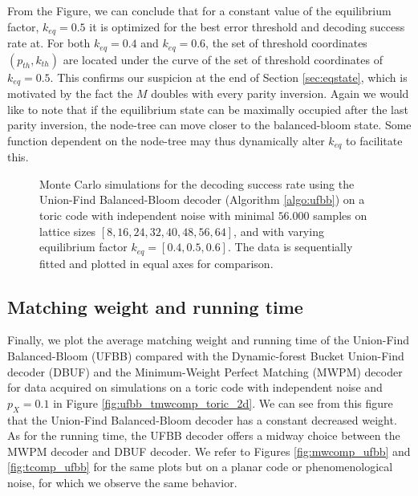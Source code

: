 From the Figure, we can conclude that for a constant value of the equilibrium factor, $k_{eq}=0.5$ it is optimized for the best error threshold and decoding success rate at. For both $k_{eq}=0.4$ and $k_{eq}=0.6$, the set of threshold coordinates $(p_{th}, k_{th})$ are located under the curve of the set of threshold coordinates of $k_{eq}=0.5$. This confirms our suspicion at the end of Section \ref{sec:eqstate}, which is motivated by the fact the $M$ doubles with every parity inversion. Again we would like to note that if the equilibrium state can be maximally occupied after the last parity inversion, the node-tree can move closer to the balanced-bloom state. Some function dependent on the node-tree may thus dynamically alter $k_{eq}$ to facilitate this. 

\begin{figure}[htbp]
  \centering
  \begin{subfigure}[b]{\textwidth}
    \begin{adjustbox}{Clip=0 1em 0 0}
      
    \end{adjustbox}
  \end{subfigure}

  \begin{subfigure}[b]{\textwidth}
    \begin{adjustbox}{Clip=0 1em 0 0}
      
    \end{adjustbox}
  \end{subfigure}

\caption{Monte Carlo simulations for the decoding success rate using the Union-Find Balanced-Bloom decoder (Algorithm \ref{algo:ufbb}) on a toric code with independent noise with minimal $56.000$ samples on lattice sizes $[8, 16, 24, 32, 40, 48, 56, 64]$, and with varying equilibrium factor $k_{eq} = [0.4, 0.5, 0.6]$. The data is sequentially fitted and plotted in equal axes for comparison.}
  \label{fig:thres_ufbb_toric_2d_fb}
\end{figure}

\subsection{Matching weight and running time}

Finally, we plot the average matching weight and running time of the Union-Find Balanced-Bloom (UFBB) compared with the Dynamic-forest Bucket Union-Find decoder (DBUF) and the Minimum-Weight Perfect Matching (MWPM) decoder for data acquired on simulations on a toric code with independent noise and $p_X = 0.1$ in Figure \ref{fig:ufbb_tmwcomp_toric_2d}. We can see from this figure that the Union-Find Balanced-Bloom decoder has a constant decreased weight. As for the running time, the UFBB decoder offers a midway choice between the MWPM decoder and DBUF decoder. We refer to Figures \ref{fig:mwcomp_ufbb} and \ref{fig:tcomp_ufbb} for the same plots but on a planar code or phenomenological noise, for which we observe the same behavior. 

